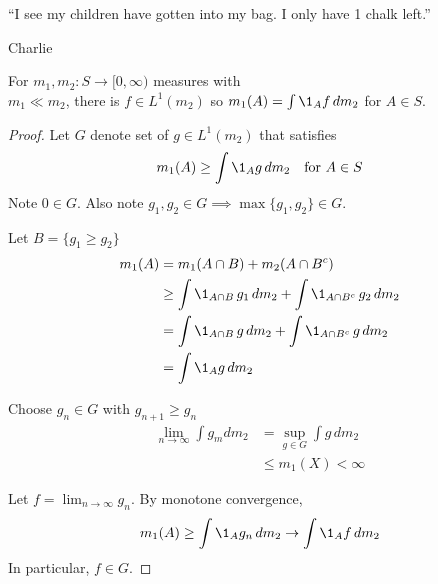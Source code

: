 \epigraph{``I see my children have gotten into my bag. I only have 1 chalk left.''}{Charlie}

\begin{theorem}
	For $m_1, m_2 : S \to [0, \infty) $ measures with \\
	$m_1 \ll m_2$, there is  $f \in L^1 (m_2)$ so
	$m_1 (A) = \int \1_A f \, dm_2$ for $A \in S$.
\end{theorem}

\begin{proof}
	Let $G$ denote set of $g \in L^1 (m_2)$ that satisfies
	\begin{align*}
		m_1 (A) \geq \int \1_A g \, dm_2 \quad \text{for } A \in S
	\end{align*}
	Note $0 \in G$. Also note
	$g_1 , g_2 \in G \implies \max \{g_1, g_2\} \in G$.

	Let $B = \{g_1 \geq g_2\}$
	\begin{align*}
		m_1 (A) &= m_1 (A \cap B) + m_2 (A \cap B^c) \\
				&\geq \int \1_{A \cap B} \, g_1 \, d m_2 + \int \1_{A \cap B^c} \, g_2 \, dm_2 \\
				&= \int \1_{A \cap B} \, g \, d m_2 + \int \1_{A \cap B^c} \, g \, dm_2 \\
				&= \int \1_A g \, dm_2
	\end{align*}

	Choose $g_n \in G$ with $g_{n+1} \geq g_n$
	\begin{align*}
		\lim_{n \to \infty} \int g_{m} d m_2 &= \sup_{g \in G} \int g \, dm_2 \\
											 &\leq m_1 (X) < \infty
	\end{align*}

	Let $f = \lim_{n\to \infty} g_n$. By monotone convergence,
	\begin{align*}
		m_1 (A) \geq \int \1_A g_n \, dm_2 \to \int \1_{A} f \, dm_2
	\end{align*} In particular, $f \in G$.


\end{proof}
